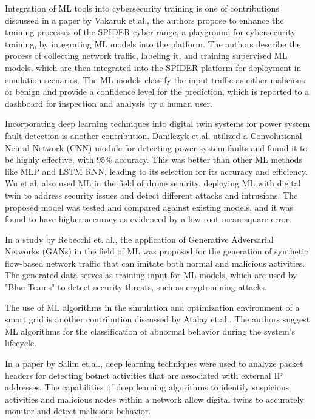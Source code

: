Integration of ML tools into cybersecurity training is one of contributions discussed in a paper by Vakaruk et.al.\cite{vakarukDigitalTwinNetwork2021}, the authors propose to enhance the training processes of the SPIDER cyber range, a playground for cybersecurity training, by integrating ML models into the platform. The authors describe the process of collecting network traffic, labeling it, and training supervised ML models, which are then integrated into the SPIDER platform for deployment in emulation scenarios. The ML models classify the input traffic as either malicious or benign and provide a confidence level for the prediction, which is reported to a dashboard for inspection and analysis by a human user.  

Incorporating deep learning techniques into digital twin systems for power system fault detection is another contribution. Danilczyk et.al.\cite{danilczykSmartGridAnomaly2021} utilized a Convolutional Neural Network (CNN) module for detecting power system faults and found it to be highly effective, with 95\% accuracy. This was better than other ML methods like MLP and LSTM RNN, leading to its selection for its accuracy and efficiency.  
Wu et.al.\cite{wuDeepLearningDriven2022} also used ML in the field of drone security, deploying ML with digital twin to address security issues and detect different attacks and intrusions. The proposed model was tested and compared against existing models, and it was found to have higher accuracy as evidenced by a low root mean square error.  

In a study by Rebecchi et. al.\cite{rebecchiDigitalTwin5G2022}, the application of Generative Adversarial Networks (GANs) in the field of ML was proposed for the generation of synthetic flow-based network traffic that can imitate both normal and malicious activities. The generated data serves as training input for ML models, which are used by "Blue Teams" to detect security threats, such as cryptomining attacks.  

The use of ML algorithms in the simulation and optimization environment of a smart grid is another contribution discussed by Atalay et.al.\cite{atalayDigitalTwinsApproach2020}. The authors suggest ML algorithms for the classification of abnormal behavior during the system's lifecycle.  

In a paper by Salim et.al.\cite{salimBlockchainEnabledSecureDigital2022}, deep learning techniques were used to analyze packet headers for detecting botnet activities that are associated with external IP addresses. The capabilities of deep learning algorithms to identify suspicious activities and malicious nodes within a network allow digital twins to accurately monitor and detect malicious behavior.  


